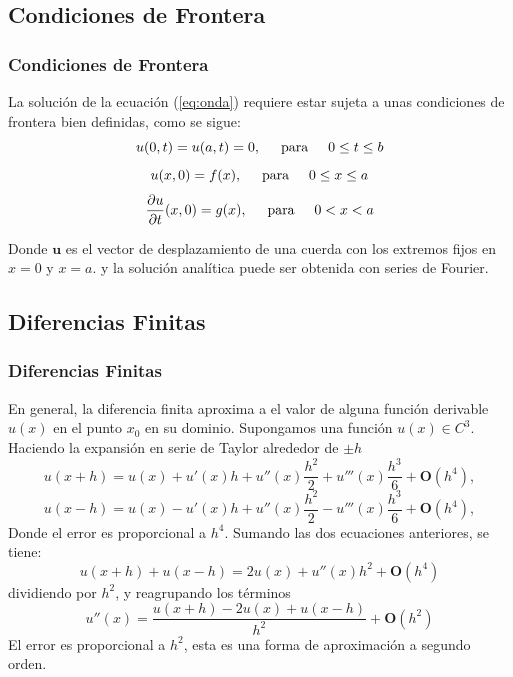 \documentclass{beamer}
\begin{document}

\begin{frame}
\section{Condiciones de Frontera}
\frametitle{Condiciones de Frontera}
La solución de la ecuación (\ref{eq:onda}) requiere estar sujeta a unas condiciones de frontera bien definidas, como se sigue:
\begin{equation}
    u(0,t)=u(a,t)=0, \hspace{0.5cm} \text{para}\hspace{0.5cm} 0\leq t\leq b
\end{equation}
\begin{equation*}
    u(x,0)=f(x), \hspace{0.5cm}\text{para}\hspace{0.5cm} 0\leq x\leq a
\end{equation*}
\begin{equation*}
    \frac{\partial u}{\partial t}(x,0)=g(x), \hspace{0.5cm} \text{para}\hspace{0.5cm} 0<x<a
\end{equation*}


Donde $\textbf{u}$ es el  vector de desplazamiento  de una cuerda con los extremos fijos en $x=0$ y $x=a$. y la solución analítica puede ser obtenida con series de Fourier.
\end{frame}

\begin{frame}
\section{Diferencias Finitas}
\frametitle{Diferencias Finitas}
En general, la diferencia finita aproxima a el valor de alguna función derivable $u(x)$ en el punto $x_0$ en su dominio. 
Supongamos una función $u(x)\in C^3$. Haciendo la expansión en serie de Taylor alrededor de $\pm h $
\begin{equation*}
    u(x+h)=u(x)+u'(x)h+u''(x)\frac{h^2}{2}+u'''(x)\frac{h^3}{6}+\textbf{O}(h^4),
\end{equation*}
\begin{equation*}
    u(x-h)=u(x)-u'(x)h+u''(x)\frac{h^2}{2}-u'''(x)\frac{h^3}{6}+\textbf{O}(h^4),
\end{equation*}
Donde el error es proporcional a $h^4$. Sumando las dos ecuaciones anteriores, se tiene:
\begin{equation*}
    u(x+h)+u(x-h)=2u(x)+u''(x)h^2+\textbf{O}(h^4)
\end{equation*}
dividiendo por $h^2$, y reagrupando los términos
\begin{equation}\label{eq:Diferencias}
    u''(x)=\frac{u(x+h)-2u(x)+u(x-h)}{h^2}+\textbf{O}(h^2)
\end{equation}
El error es proporcional a $h^2$, esta es una forma de aproximación a segundo orden. 
\end{frame}
\end{document}
